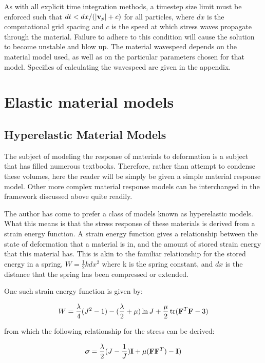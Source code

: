As with all explicit time integration methods, a timestep size 
limit must
be enforced such that $dt < dx/(|\mbox{\ensuremath{\mathbf{v}}}_p| + c)$ for all 
particles, where $dx$ is the computational grid spacing and $c$ 
is the speed at which stress waves propagate through the 
material.
Failure to adhere to this condition will cause the solution to 
become
unstable and blow up.  The material wavespeed depends on the 
material model used, as well as on the particular parameters
chosen for that model.  Specifics of calculating the wavespeed
are given in the appendix.

%
%

\chapter{Elastic material models}
\section{Hyperelastic Material Models}

The subject of modeling the response of materials to deformation 
is a subject that has filled numerous textbooks.  Therefore, 
rather than attempt to condense these volumes, here the reader 
will be simply be given a simple material response model.  Other 
more complex material response models can be interchanged in the 
framework discussed above quite readily.

The author has come to prefer a class of models known as 
hyperelastic models.  What this means is that the stress 
response of these materials is derived from a strain energy 
function.  A strain energy function gives a relationship between 
the state of deformation that a material is in, and the amount 
of stored strain energy that this material has.  This is akin to 
the familiar relationship for the stored energy in a spring, 
$W=\frac{1}{2} k dx^2$ where k is the spring constant, and $dx$ is
the distance that the spring has been compressed or extended.

One such strain energy function is given by:

\begin{equation}
	W = \frac{\lambda}{4}(J^2-1)
 - (\frac{\lambda}{2}+\mu) \ln J
+ \frac{\mu}{2}\,\text{tr}(\mbox{\ensuremath{\mathbf{F}}}^T\mbox{\ensuremath{\mathbf{F}}} - 3)
\end{equation}

from which the following relationship for the stress can be 
derived:

\begin{equation}
       \mbox{\boldmath $\sigma \!\!$ \unboldmath} = \frac{\lambda}{2}(J-\frac{1}{J})\mbox{\ensuremath{\mathbf{I}}} 
  + \mu (\mbox{\ensuremath{\mathbf{F}}}\mbox{\ensuremath{\mathbf{F}}}^T) - \mbox{\ensuremath{\mathbf{I}}})
 \label{stress}
\end{equation}

